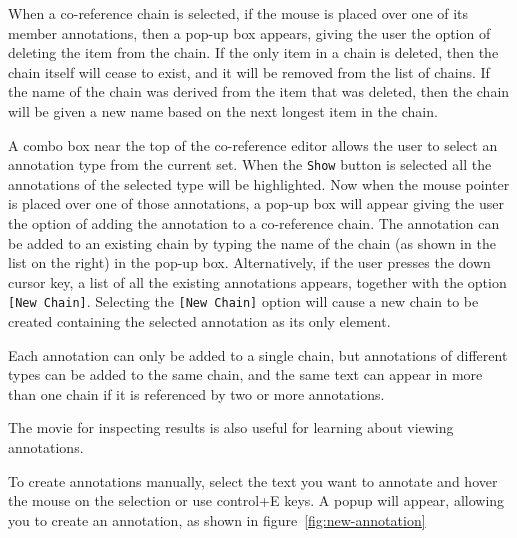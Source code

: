 When a co-reference chain is selected, if the mouse is placed over one of its
member annotations, then a pop-up box appears, giving the user the option
of deleting the item from the chain. If the only item in a chain is deleted, 
then the chain itself will cease to exist, and it will be removed from the list
of chains. If the name of the chain was derived from the item that was deleted,
then the chain will be given a new name based on the next longest item in the
chain.

A combo box near the top of the co-reference editor allows the user to select
an annotation type from the current set. When the {\tt Show} button is selected
all the annotations of the selected type will be highlighted. Now when the 
mouse pointer is placed over one of those annotations, a pop-up box will appear
giving the user the option of adding the annotation to a co-reference chain. 
The annotation can be added to an existing chain by typing the name of the 
chain (as shown in the list on the right) in the pop-up box. Alternatively, if the 
user presses the down cursor key, a list of all the existing annotations 
appears, together with the option {\tt [New Chain]}. Selecting the 
{\tt [New Chain]} option will cause a new chain to be created containing
the selected annotation as its only element.

Each annotation can only be added to a single chain, but annotations of 
different types can be added to the same chain, and the same text can
appear in more than one chain if it is referenced by two or more 
annotations.

The 
{movie for inspecting results} is also useful for learning about viewing
annotations.




To create annotations manually, select the text you want to annotate and
hover the mouse on the selection or use control+E keys. A popup will
appear, allowing you to create an annotation, as shown in
figure~\ref{fig:new-annotation}

